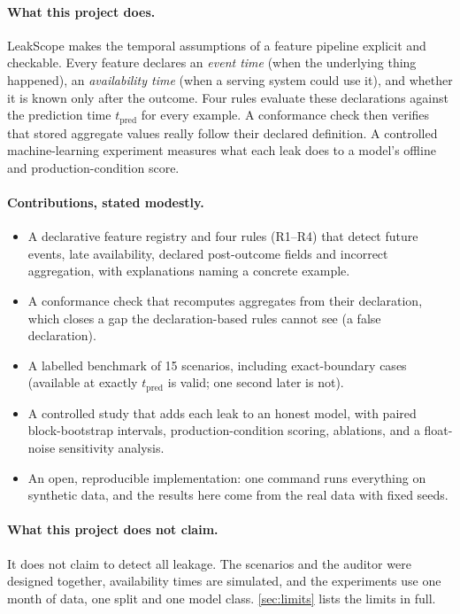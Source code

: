 \documentclass[11pt,a4paper]{article}
\newcommand{\tpred}{$t_{\mathrm{pred}}$}
\begin{document}
\paragraph{What this project does.} LeakScope makes the temporal assumptions of a feature pipeline explicit and checkable. Every feature declares an \emph{event time} (when the underlying thing happened), an \emph{availability time} (when a serving system could use it), and whether it is known only after the outcome. Four rules evaluate these declarations against the prediction time \tpred{} for every example. A conformance check then verifies that stored aggregate values really follow their declared definition. A controlled machine-learning experiment measures what each leak does to a model's offline and production-condition score.

\paragraph{Contributions, stated modestly.}
\begin{itemize}
  \item A declarative feature registry and four rules (R1--R4) that detect future events, late availability, declared post-outcome fields and incorrect aggregation, with explanations naming a concrete example.
  \item A conformance check that recomputes aggregates from their declaration, which closes a gap the declaration-based rules cannot see (a false declaration).
  \item A labelled benchmark of 15 scenarios, including exact-boundary cases (available at exactly \tpred{} is valid; one second later is not).
  \item A controlled study that adds each leak to an honest model, with paired block-bootstrap intervals, production-condition scoring, ablations, and a float-noise sensitivity analysis.
  \item An open, reproducible implementation: one command runs everything on synthetic data, and the results here come from the real data with fixed seeds.
\end{itemize}

\paragraph{What this project does not claim.} It does not claim to detect all leakage. The scenarios and the auditor were designed together, availability times are simulated, and the experiments use one month of data, one split and one model class. \autoref{sec:limits} lists the limits in full.
\end{document}
